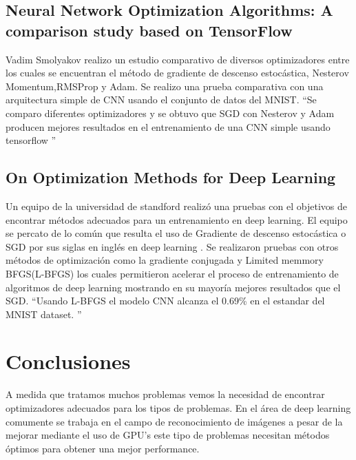 \subsection{Neural Network Optimization Algorithms: A comparison study based on TensorFlow}
Vadim Smolyakov realizo un estudio comparativo de diversos optimizadores entre los cuales se encuentran el método de gradiente de descenso estocástica, Nesterov Momentum,RMSProp y Adam. Se realizo una prueba comparativa con una arquitectura simple de CNN usando el conjunto de datos del MNIST. \textquotedblleft Se comparo diferentes optimizadores y se obtuvo que SGD con Nesterov y Adam producen mejores resultados en el entrenamiento de una CNN simple usando tensorflow \textquotedblright \cite{Optimization}
\subsection{On Optimization Methods for Deep Learning}
Un equipo de la universidad de standford realizó una pruebas con el objetivos de encontrar métodos adecuados para un entrenamiento en deep learning. El equipo se percato de lo común que resulta el uso de Gradiente de descenso estocástica o SGD por sus siglas en inglés en deep learning . Se realizaron pruebas con otros métodos de optimización como la gradiente conjugada y Limited memmory BFGS(L-BFGS) los cuales permitieron acelerar el proceso de entrenamiento de algoritmos de deep learning mostrando en su mayoría mejores resultados que el SGD. \textquotedblleft Usando L-BFGS el modelo CNN alcanza el 0.69\%  en el estandar del MNIST dataset. \textquotedblright
\section{Conclusiones}
A medida que tratamos muchos problemas vemos la necesidad de encontrar optimizadores adecuados para los tipos de problemas. En el área de deep learning comumente se trabaja en el campo de reconocimiento de imágenes a pesar de la mejorar mediante el uso de GPU's este tipo de problemas necesitan métodos óptimos para obtener una mejor performance.

